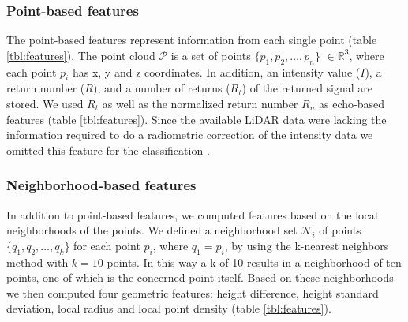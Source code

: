 \subsubsection{Point-based features}
The point-based features represent information from each single point (table \ref{tbl:features}). The point cloud \(\mathcal{P}\) is a set of points \(\{p_{1}, p_{2}, \dots, p_{n}\}\) \(\in \mathbb{R}^3\), where each point \(p_{i}\) has x, y and z coordinates. In addition, an intensity value (\(I\)), a return number (\(R\)), and a number of returns (\(R_{t}\)) of the returned signal are stored. We used \(R_{t}\) as well as the normalized return number \(R_{n}\) as echo-based features (table \ref{tbl:features}). Since the available LiDAR data were lacking the information required to do a radiometric correction of the intensity data we omitted this feature for the classification \citep{kashani2015review}.

\subsubsection{Neighborhood-based features}
In addition to point-based features, we computed features based on the local neighborhoods of the points. We defined a neighborhood set \(\mathcal{N}_{i}\) of points \(\{q_{1}, q_{2}, \dots, q_{k}\}\) for each point \(p_{i}\), where \(q_{1} = p_{i}\), by using the k-nearest neighbors method with \(k = 10\) points. In this way a k of 10 results in a neighborhood of ten points, one of which is the concerned point itself. Based on these neighborhoods we then computed four geometric features: height difference, height standard deviation, local radius and local point density (table \ref{tbl:features}).

